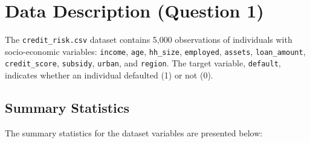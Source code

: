 \documentclass[a4paper,12pt,headsepline]{scrartcl} %
\begin{document}
\section{Data Description (Question 1)}
The \texttt{credit\_risk.csv} dataset contains 5,000 observations of individuals with socio-economic variables: \texttt{income}, \texttt{age}, \texttt{hh\_size}, \texttt{employed}, \texttt{assets}, \texttt{loan\_amount}, \texttt{credit\_score}, \texttt{subsidy}, \texttt{urban}, and \texttt{region}. The target variable, \texttt{default}, indicates whether an individual defaulted (1) or not (0).

\subsection{Summary Statistics}
The summary statistics for the dataset variables are presented below:

\begin{table}[h]
\centering
\small
{}
\caption{Summary statistics of the \texttt{credit\_risk.csv} dataset. Note: \texttt{region} is categorical and excluded from numerical statistics.}
\label{tab:summary_stats}
\end{table}
\end{document}
